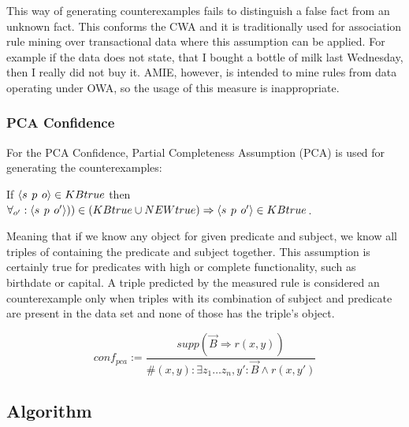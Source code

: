 This way of generating counterexamples fails to distinguish a false fact from an unknown fact. This conforms the CWA and it is traditionally used for association rule mining over transactional data where this assumption can be applied. For example if the data does not state, that I bought a bottle of milk last Wednesday, then I really did not buy it. AMIE, however, is intended to mine rules from data operating under OWA, so the usage of this measure is inappropriate.

\subsubsection{PCA Confidence}

For the PCA Confidence, Partial Completeness Assumption (PCA) is used for generating the counterexamples:

If $\langle s\hspace{0.4em}p\hspace{0.4em}o\rangle\in KBtrue$ then $\forall_{o'}: \langle s\hspace{0.4em}p\hspace{0.4em}o'\rangle))\in(KBtrue \cup NEWtrue) \Rightarrow \langle s\hspace{0.4em}p\hspace{0.4em}o'\rangle\in KBtrue$.

Meaning that if we know any object for given predicate and subject, we know all triples of containing the predicate and subject together. This assumption is certainly true for predicates with high or complete functionality, such as birthdate or capital. A triple predicted by the measured rule is considered an counterexample only when triples with its combination of subject and predicate are present in the data set and none of those has the triple's object. 







$$conf_{pca} := \frac{supp(\vec{B} \Rightarrow r(x,y))}{\# (x,y): \exists z_{1}\ldots z_{n},y': \vec{B}\land r(x,y')}$$

\subsection{Algorithm}

